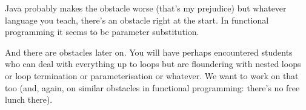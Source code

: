 \documentclass[11pt,a4paper]{article}
\begin{document}
Java probably makes the obstacle worse (that's my prejudice) but whatever language you teach, there's an obstacle right at the start. In functional programming it seems to be parameter substitution. 

And there are obstacles later on. You will have perhaps encountered students who can deal with everything up to loops but are floundering with nested loops or loop termination or parameterisation or whatever. We want to work on that too (and, again, on similar obstacles in functional programming: there's no free lunch there).



 
\end{document}
